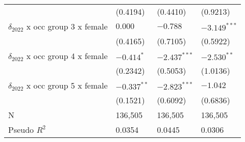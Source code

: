 \begin{tabular}{llll}
                                       &           (0.4194) &           (0.4410) &           (0.9213) \\
$\delta_{2022}$ x occ group 3 x female &            $0.000$ &           $-0.788$ &     $-3.149^{***}$ \\
                                       &           (0.4165) &           (0.7105) &           (0.5922) \\
$\delta_{2022}$ x occ group 4 x female &         $-0.414^*$ &     $-2.437^{***}$ &      $-2.530^{**}$ \\
                                       &           (0.2342) &           (0.5053) &           (1.0136) \\
$\delta_{2022}$ x occ group 5 x female &      $-0.337^{**}$ &     $-2.823^{***}$ &           $-1.042$ \\
                                       &           (0.1521) &           (0.6092) &           (0.6836) \\
\midrule
N                                      &            136,505 &            136,505 &            136,505 \\
Pseudo $R^2$                           &             0.0354 &             0.0445 &             0.0306 \\
\bottomrule
\end{tabular}
